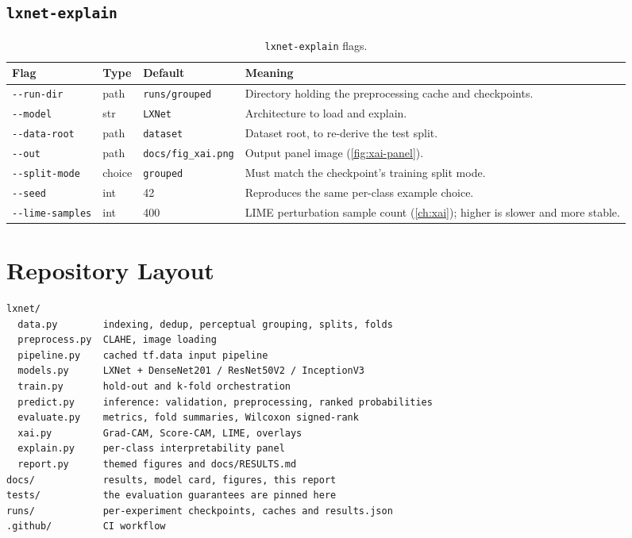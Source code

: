 \documentclass[11pt,a4paper,oneside]{report}
\newcommand{\code}[1]{\texttt{\small #1}}
\begin{document}
\section{\code{lxnet-explain}}

\begin{table}[h]
\centering
\small
\begin{tabularx}{\linewidth}{@{}lll X@{}}
\toprule
\textbf{Flag} & \textbf{Type} & \textbf{Default} & \textbf{Meaning} \\
\midrule
\code{-{}-run-dir} & path & \code{runs/grouped} & Directory holding the
  preprocessing cache and checkpoints. \\
\code{-{}-model} & str & \code{LXNet} & Architecture to load and explain. \\
\code{-{}-data-root} & path & \code{dataset} & Dataset root, to re-derive
  the test split. \\
\code{-{}-out} & path & \code{docs/fig\_xai.png} & Output panel image
  (\cref{fig:xai-panel}). \\
\code{-{}-split-mode} & choice & \code{grouped} & Must match the checkpoint's
  training split mode. \\
\code{-{}-seed} & int & 42 & Reproduces the same per-class example choice. \\
\code{-{}-lime-samples} & int & 400 & LIME perturbation sample count
  (\cref{ch:xai}); higher is slower and more stable. \\
\bottomrule
\end{tabularx}
\caption{\texttt{lxnet-explain} flags.}
\label{tab:cli-explain}
\end{table}

\chapter{Repository Layout}
\label{ap:layout}

\begin{lstlisting}[language=bash, basicstyle=\ttfamily\small, frame=single,
  rulecolor=\color{rulegray}, backgroundcolor=\color{panelbg}]
lxnet/
  data.py        indexing, dedup, perceptual grouping, splits, folds
  preprocess.py  CLAHE, image loading
  pipeline.py    cached tf.data input pipeline
  models.py      LXNet + DenseNet201 / ResNet50V2 / InceptionV3
  train.py       hold-out and k-fold orchestration
  predict.py     inference: validation, preprocessing, ranked probabilities
  evaluate.py    metrics, fold summaries, Wilcoxon signed-rank
  xai.py         Grad-CAM, Score-CAM, LIME, overlays
  explain.py     per-class interpretability panel
  report.py      themed figures and docs/RESULTS.md
docs/            results, model card, figures, this report
tests/           the evaluation guarantees are pinned here
runs/            per-experiment checkpoints, caches and results.json
.github/         CI workflow
\end{lstlisting}
\end{document}
